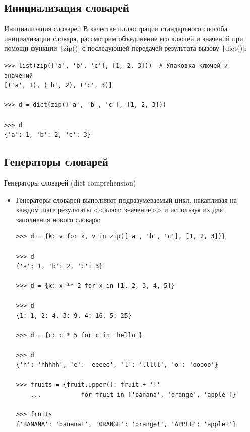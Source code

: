 \documentclass[aspectratio=169, mathserif]{beamer}%
\begin{document}
\subsection{Инициализация словарей}

\begin{frame}[fragile]{Инициализация словарей}
\scriptsize
В качестве иллюстрации  стандартного способа инициализации словаря, рассмотрим объединение его ключей и значений при помощи функции \texttt|zip()| с последующей передачей результата вызову \texttt|dict()|:

\begin{verbatim}
>>> list(zip(['a', 'b', 'c'], [1, 2, 3]))  # Упаковка ключей и значений
[('a', 1), ('b', 2), ('c', 3)]

>>> d = dict(zip(['a', 'b', 'c'], [1, 2, 3]))

>>> d
{'a': 1, 'b': 2, 'c': 3}
\end{verbatim}
\vfill
\end{frame}


\subsection{Генераторы словарей}

\begin{frame}[fragile]{Генераторы словарей (dict comprehension)}
\scriptsize
\begin{itemize}
\item Генераторы словарей выполняют подразумеваемый цикл, накапливая на каждом шаге результаты <<ключ: значение>> и используя их для заполнения нового словаря:

\begin{verbatim}
>>> d = {k: v for k, v in zip(['a', 'b', 'c'], [1, 2, 3])}

>>> d
{'a': 1, 'b': 2, 'c': 3}

>>> d = {x: x ** 2 for x in [1, 2, 3, 4, 5]}

>>> d
{1: 1, 2: 4, 3: 9, 4: 16, 5: 25}

>>> d = {c: c * 5 for c in 'hello'}

>>> d
{'h': 'hhhhh', 'e': 'eeeee', 'l': 'lllll', 'o': 'ooooo'}

>>> fruits = {fruit.upper(): fruit + '!' 
	...           for fruit in ['banana', 'orange', 'apple']}

>>> fruits
{'BANANA': 'banana!', 'ORANGE': 'orange!', 'APPLE': 'apple!'}
\end{verbatim}
\end{itemize}
\vfill
\end{frame}
\end{document}

